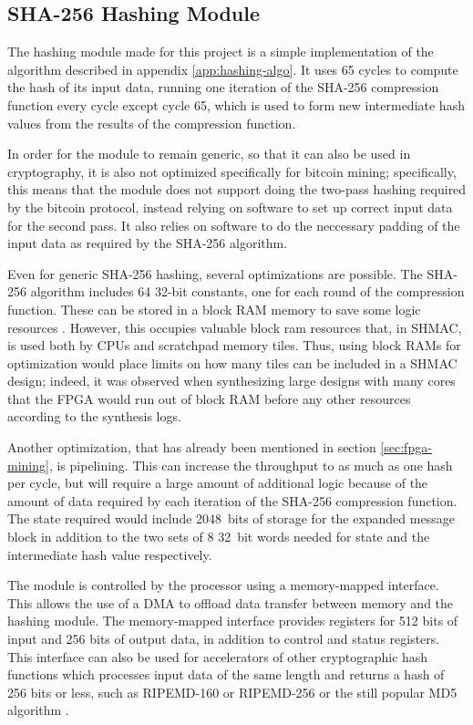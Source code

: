 \subsection{SHA-256 Hashing Module}

The hashing module made for this project is a simple implementation of the algorithm described in
appendix \ref{app:hashing-algo}. It uses 65 cycles to compute the hash of its input data, running
one iteration of the SHA-256 compression function every cycle except cycle 65, which is used to
form new intermediate hash values from the results of the compression function.

In order for the module to remain generic, so that it can also be used in cryptography, it
is also not optimized specifically for bitcoin mining; specifically, this means that the module
does not support doing the two-pass hashing required by the bitcoin protocol, instead relying
on software to set up correct input data for the second pass. It also relies on software to
do the neccessary padding of the input data as required by the SHA-256 algorithm.

Even for generic SHA-256 hashing, several optimizations are possible. The SHA-256 algorithm
includes 64 32-bit constants, one for each round of the compression function. These can be
stored in a block RAM memory to save some logic resources \cite{optimizing-sha2}. However, this occupies valuable
block ram resources that, in SHMAC, is used both by CPUs and scratchpad memory tiles. Thus,
using block RAMs for optimization would place limits on how many tiles can be included in
a SHMAC design; indeed, it was observed when synthesizing large designs with many cores
that the FPGA would run out of block RAM before any other resources according to the synthesis logs.

Another optimization, that has already been mentioned in section \ref{sec:fpga-mining}, is
pipelining. This can increase the throughput to as much as one hash per cycle, but will require
a large amount of additional logic because of the amount of data required by each iteration
of the SHA-256 compression function. The state required would include 2048~bits of storage
for the expanded message block in addition to the two sets of 8 32~bit words needed for
state and the intermediate hash value respectively.

The module is controlled by the processor using a memory-mapped interface. This allows the use
of a DMA to offload data transfer between memory and the hashing module. The memory-mapped interface
provides registers for 512 bits of input and 256 bits of output data, in addition to control and
status registers. This interface can also be used for accelerators of other cryptographic hash
functions which processes input data of the same length and returns a hash of 256 bits or less,
such as RIPEMD-160 or RIPEMD-256 \cite{ripemd} or the still popular MD5 algorithm \cite{md5}.

